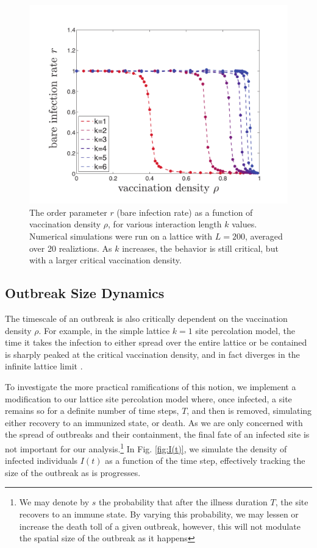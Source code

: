 \documentclass{article}
\begin{document}
\begin{figure}[H]
\centering
\includegraphics[scale=0.4]{figs/critical_shift.eps}
\caption{The order parameter $r$ (bare infection rate) as a function of vaccination density $\rho$, for various interaction length $k$ values. Numerical simulations were run on a lattice with $L=200$, averaged over 20 realiztions. As $k$ increases, the behavior is still critical, but with a larger critical vaccination density.}
\label{fig:Critical Point Shifting}
\end{figure}

\subsection{Outbreak Size Dynamics}

The timescale of an outbreak is also critically dependent on the vaccination density $\rho$. For example, in the simple lattice $k=1$ site percolation model, the time it takes the infection to either spread over the entire lattice or be contained is sharply peaked at the critical vaccination density, and in fact diverges in the infinite lattice limit \cite{Sole2011}. 

To investigate the more practical ramifications of this notion, we implement a modification to our lattice site percolation model where, once infected, a site remains so for a definite number of time steps, $T$, and then is removed, simulating either recovery to an immunized state, or death. As we are only concerned with the spread of outbreaks and their containment, the final fate of an infected site is not important for our analysis.\footnote{We may denote by $s$ the probability that after the illness duration $T$, the site recovers to an immune state. By varying this probability, we may lessen or increase the death toll of a given outbreak, however, this will not modulate the spatial size of the outbreak as it happens} In Fig. \ref{fig:I(t)}, we simulate the density of infected individuals $I(t)$ as a function of the time step, effectively tracking the size of the outbreak as is progresses. 
\end{document}
